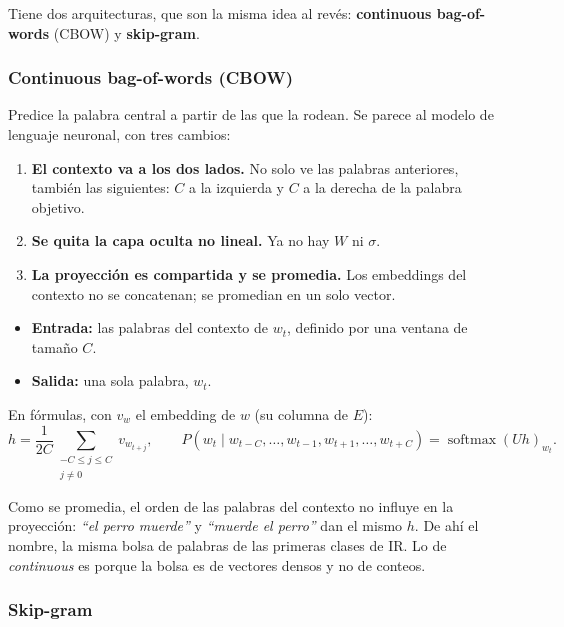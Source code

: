 \documentclass[11pt,letterpaper]{article}
\begin{document}
Tiene dos arquitecturas, que son la misma idea al revés:
\textbf{continuous bag-of-words} (CBOW) y \textbf{skip-gram}.

\subsubsection*{Continuous bag-of-words (CBOW)}

Predice la palabra central a partir de las que la rodean. Se parece al
modelo de lenguaje neuronal, con tres cambios:

\begin{enumerate}[itemsep=0.3em]
    \item \textbf{El contexto va a los dos lados.} No solo ve las
          palabras anteriores, también las siguientes: $C$ a la
          izquierda y $C$ a la derecha de la palabra objetivo.
    \item \textbf{Se quita la capa oculta no lineal.} Ya no hay $W$ ni
          $\sigma$.
    \item \textbf{La proyección es compartida y se promedia.} Los
          embeddings del contexto no se concatenan; se promedian en un
          solo vector.
\end{enumerate}

\begin{itemize}[itemsep=0.2em]
    \item \textbf{Entrada:} las palabras del contexto de $w_t$,
          definido por una ventana de tamaño $C$.
    \item \textbf{Salida:} una sola palabra, $w_t$.
\end{itemize}

En fórmulas, con $v_w$ el embedding de $w$ (su columna de $E$):
\[
    h = \frac{1}{2C} \sum_{\substack{-C \le j \le C \\ j \ne 0}}
        v_{w_{t+j}} ,
    \qquad
    P(w_t \mid w_{t-C}, \ldots, w_{t-1}, w_{t+1}, \ldots, w_{t+C})
    = \operatorname{softmax}(U h)_{w_t} .
\]

\begin{ojo}
    Como se promedia, el orden de las palabras del contexto no influye
    en la proyección: \textit{``el perro muerde''} y \textit{``muerde
    el perro''} dan el mismo $h$. De ahí el nombre, la misma bolsa de
    palabras de las primeras clases de IR. Lo de \textit{continuous} es
    porque la bolsa es de vectores densos y no de conteos.
\end{ojo}

\subsubsection*{Skip-gram}
\end{document}
